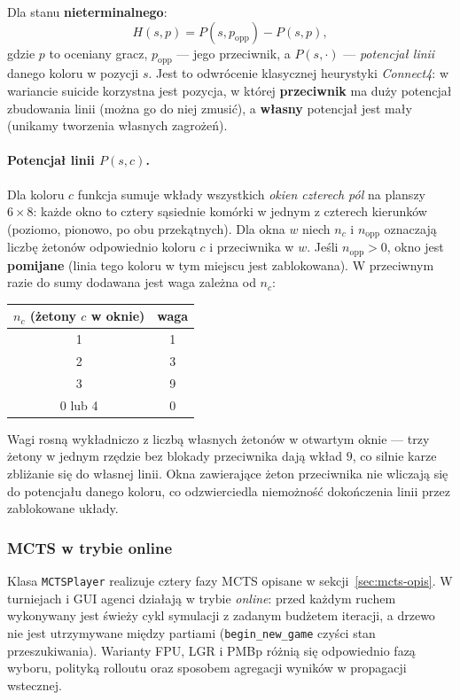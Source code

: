 \documentclass[11pt, a4paper]{article}
\begin{document}
Dla stanu \textbf{nieterminalnego}:
\begin{equation}
    H(s, p) = P(s, p_{\mathrm{opp}}) - P(s, p),
    \label{eq:minimax-heuristic}
\end{equation}
gdzie $p$ to oceniany gracz, $p_{\mathrm{opp}}$ --- jego przeciwnik, a $P(s, \cdot)$ --- \emph{potencjał linii} danego koloru w pozycji $s$. Jest to odwrócenie klasycznej heurystyki \textit{Connect4}: w wariancie suicide korzystna jest pozycja, w której \textbf{przeciwnik} ma duży potencjał zbudowania linii (można go do niej zmusić), a \textbf{własny} potencjał jest mały (unikamy tworzenia własnych zagrożeń).

\paragraph{Potencjał linii $P(s, c)$.}
Dla koloru $c$ funkcja sumuje wkłady wszystkich \emph{okien czterech pól} na planszy $6 \times 8$: każde okno to cztery sąsiednie komórki w jednym z czterech kierunków (poziomo, pionowo, po obu przekątnych). Dla okna $w$ niech $n_c$ i $n_{\mathrm{opp}}$ oznaczają liczbę żetonów odpowiednio koloru $c$ i przeciwnika w $w$. Jeśli $n_{\mathrm{opp}} > 0$, okno jest \textbf{pomijane} (linia tego koloru w tym miejscu jest zablokowana). W przeciwnym razie do sumy dodawana jest waga zależna od $n_c$:
\begin{center}
\begin{tabular}{cc}
    \toprule
    $n_c$ (żetony $c$ w oknie) & waga \\
    \midrule
    1 & 1 \\
    2 & 3 \\
    3 & 9 \\
    0 lub 4 & 0 \\
    \bottomrule
\end{tabular}
\end{center}
\noindent
Wagi rosną wykładniczo z liczbą własnych żetonów w otwartym oknie --- trzy żetony w jednym rzędzie bez blokady przeciwnika dają wkład $9$, co silnie karze zbliżanie się do własnej linii. Okna zawierające żeton przeciwnika nie wliczają się do potencjału danego koloru, co odzwierciedla niemożność dokończenia linii przez zablokowane układy.


\subsubsection{MCTS w trybie online}

Klasa \texttt{MCTSPlayer} realizuje cztery fazy MCTS opisane w sekcji~\ref{sec:mcts-opis}. W turniejach i GUI agenci działają w trybie \emph{online}: przed każdym ruchem wykonywany jest świeży cykl symulacji z zadanym budżetem iteracji, a drzewo nie jest utrzymywane między partiami (\texttt{begin\_new\_game} czyści stan przeszukiwania). Warianty FPU, LGR i PMBp różnią się odpowiednio fazą wyboru, polityką rolloutu oraz sposobem agregacji wyników w propagacji wstecznej.
\end{document}
